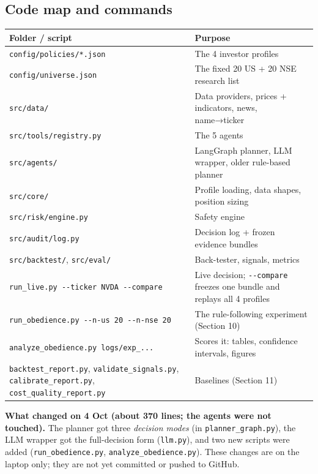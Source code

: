 \documentclass[10.5pt,a4paper]{article}
\newcommand{\file}[1]{\texttt{#1}}
\begin{document}
\subsection{Code map and commands}

{\small
\begin{tabularx}{\linewidth}{L{6.4cm}Y}
\toprule
\textbf{Folder / script} & \textbf{Purpose} \\
\midrule
\file{config/policies/*.json} & The 4 investor profiles \\
\file{config/universe.json} & The fixed 20 US + 20 NSE research list \\
\file{src/data/} & Data providers, prices + indicators, news, name→ticker \\
\file{src/tools/registry.py} & The 5 agents \\
\file{src/agents/} & LangGraph planner, LLM wrapper, older rule-based planner \\
\file{src/core/} & Profile loading, data shapes, position sizing \\
\file{src/risk/engine.py} & Safety engine \\
\file{src/audit/log.py} & Decision log + frozen evidence bundles \\
\file{src/backtest/}, \file{src/eval/} & Back-tester, signals, metrics \\
\midrule
\file{run\_live.py -{}-ticker NVDA -{}-compare} & Live decision; \file{-{}-compare} freezes one bundle and replays all 4 profiles \\
\file{run\_obedience.py -{}-n-us 20 -{}-n-nse 20} & The rule-following experiment (Section 10) \\
\file{analyze\_obedience.py logs/exp\_...} & Scores it: tables, confidence intervals, figures \\
\file{backtest\_report.py}, \file{validate\_signals.py}, \file{calibrate\_report.py}, \file{cost\_quality\_report.py} & Baselines (Section 11) \\
\bottomrule
\end{tabularx}}

\textbf{What changed on 4 Oct (about 370 lines; the agents were not touched).} The planner got three \emph{decision modes} (in \file{planner\_graph.py}), the LLM wrapper got the full-decision form (\file{llm.py}), and two new scripts were added (\file{run\_obedience.py}, \file{analyze\_obedience.py}). These changes are on the laptop only; they are not yet committed or pushed to GitHub.

\end{document}
